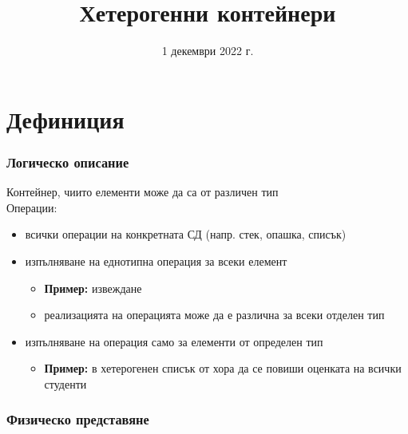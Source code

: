 \documentclass[alsotrans]{beamerswitch}
\title{Хетерогенни контейнери}
\date{1 декември 2022 г.}
\begin{document}
\begin{frame}
  \titlepage
\end{frame}

\section{Дефиниция}

\begin{frame}
  \frametitle{Логическо описание}
  Контейнер, чиито елементи може да са от различен тип\\[2ex]
  Операции:
  \begin{itemize}
  \item всички операции на конкретната СД (напр. стек, опашка, списък)
  \item изпълняване на еднотипна операция за всеки елемент
    \begin{itemize}
    \item \textbf{Пример:} извеждане
    \item реализацията на операцията може да е различна за всеки отделен тип
    \end{itemize}
  \item изпълняване на операция само за елементи от определен тип
    \begin{itemize}
    \item \textbf{Пример:} в хетерогенен списък от хора да се повиши оценката на всички студенти
    \end{itemize}
  \end{itemize}
\end{frame}

\begin{frame}
  \frametitle{Физическо представяне}
  \begin{center}
    \scriptsize
  \end{center}
\end{frame}
\end{document}
